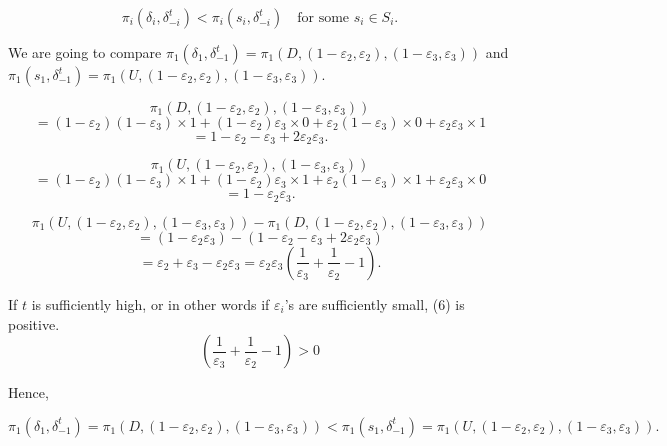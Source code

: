 \documentclass[12pt, oneside]{article}
\begin{document}
\begin{equation}
\pi_i(\delta_i, \delta^t_{-i}) < \pi_i(s_i, \delta^t_{-i}) \quad \text{for some } s_i \in S_i.
\end{equation}

We are going to compare $\pi_1(\delta_1, \delta^t_{-1}) = \pi_1(D, (1 - \varepsilon_2, \varepsilon_2), (1 - \varepsilon_3, \varepsilon_3))$ and $\pi_1(s_1, \delta^t_{-1}) = \pi_1(U, (1 - \varepsilon_2, \varepsilon_2), (1 - \varepsilon_3, \varepsilon_3))$.

\begin{equation}
\pi_1(D, (1 - \varepsilon_2, \varepsilon_2), (1 - \varepsilon_3, \varepsilon_3))
\end{equation}
\[
= (1 - \varepsilon_2)(1 - \varepsilon_3) \times 1 + (1 - \varepsilon_2)\varepsilon_3 \times 0 + \varepsilon_2(1 - \varepsilon_3) \times 0 + \varepsilon_2\varepsilon_3 \times 1
\]
\[
= 1 - \varepsilon_2 - \varepsilon_3 + 2\varepsilon_2\varepsilon_3.
\]

\begin{equation}
\pi_1(U, (1 - \varepsilon_2, \varepsilon_2), (1 - \varepsilon_3, \varepsilon_3))
\end{equation}
\[
= (1 - \varepsilon_2)(1 - \varepsilon_3) \times 1 + (1 - \varepsilon_2)\varepsilon_3 \times 1 + \varepsilon_2(1 - \varepsilon_3) \times 1 + \varepsilon_2\varepsilon_3 \times 0
\]
\[
= 1 - \varepsilon_2\varepsilon_3.
\]

\begin{equation}
\pi_1(U, (1 - \varepsilon_2, \varepsilon_2), (1 - \varepsilon_3, \varepsilon_3)) - \pi_1(D, (1 - \varepsilon_2, \varepsilon_2), (1 - \varepsilon_3, \varepsilon_3))
\end{equation}
\[
= (1 - \varepsilon_2\varepsilon_3) - (1 - \varepsilon_2 - \varepsilon_3 + 2\varepsilon_2\varepsilon_3)
\]
\[
= \varepsilon_2 + \varepsilon_3 - \varepsilon_2\varepsilon_3 = \varepsilon_2\varepsilon_3 \left(\frac{1}{\varepsilon_3} + \frac{1}{\varepsilon_2} - 1\right).
\]

If $t$ is sufficiently high, or in other words if $\varepsilon_i$'s are sufficiently small, (6) is positive.
\[
\left(\frac{1}{\varepsilon_3} + \frac{1}{\varepsilon_2} - 1\right) > 0
\]

Hence,

\begin{equation}
\pi_1(\delta_1, \delta^t_{-1}) = \pi_1(D, (1 - \varepsilon_2, \varepsilon_2), (1 - \varepsilon_3, \varepsilon_3)) < \pi_1(s_1, \delta^t_{-1}) = \pi_1(U, (1 - \varepsilon_2, \varepsilon_2), (1 - \varepsilon_3, \varepsilon_3)).
\end{equation}
\end{document}
